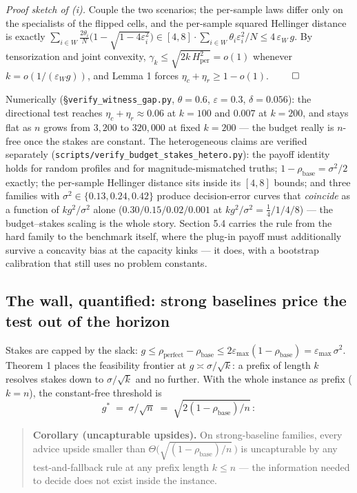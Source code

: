 \emph{Proof sketch of (i).} Couple the two scenarios; the per-sample
laws differ only on the specialists of the flipped cells, and the
per-sample squared Hellinger distance is exactly
\(\sum_{i\in W}\tfrac{2\theta_i}{N}\big(1-\sqrt{1-4\varepsilon_i^2}\big)
\in [4,8]\cdot\sum_{i\in W}\theta_i\varepsilon_i^2/N \le 4\,\varepsilon_W\,g\).
By tensorization and joint convexity,
\(\gamma_k \le \sqrt{2k\,H^2_{\mathrm{per}}} = o(1)\) whenever
\(k = o(1/(\varepsilon_W g))\), and Lemma 1 forces
\(\eta_c+\eta_r\ge 1-o(1)\). \(\qed\)

Numerically (§\texttt{verify\_witness\_gap.py}, \(\theta=0.6\),
\(\varepsilon=0.3\), \(\delta=0.056\)): the directional test reaches
\(\eta_c+\eta_r \approx 0.06\) at \(k=100\) and \(0.007\) at \(k=200\),
and stays flat as \(n\) grows from \(3{,}200\) to \(320{,}000\) at fixed
\(k=200\) --- the budget really is \(n\)-free once the stakes are
constant. The heterogeneous claims are verified separately
(\texttt{scripts/verify\_budget\_stakes\_hetero.py}): the payoff
identity holds for random profiles and for magnitude-mismatched truths;
\(1-\rho_{\mathrm{base}}=
\sigma^2/2\) exactly; the per-sample Hellinger distance sits inside its
\([4,8]\) bounds; and three families with
\(\sigma^2\in\{0.13,0.24,0.42\}\) produce decision-error curves that
\emph{coincide} as a function of \(k g^2/\sigma^2\) alone
(\(0.30/0.15/0.02/0.001\) at \(kg^2/\sigma^2=\tfrac14/1/4/8\)) --- the
budget--stakes scaling is the whole story. Section 5.4 carries the rule
from the hard family to the benchmark itself, where the plug-in payoff
must additionally survive a concavity bias at the capacity kinks --- it
does, with a bootstrap calibration that still uses no problem constants.

\subsection{The wall, quantified: strong baselines price the test out of
the
horizon}

Stakes are capped by the slack:
\(g \le \rho_{\mathrm{perfect}}-\rho_{\mathrm{base}}
\le 2\varepsilon_{\max}(1-\rho_{\mathrm{base}}) = \varepsilon_{\max}\,\sigma^2\).
Theorem 1 places the feasibility frontier at
\(g \asymp \sigma/\sqrt k\): a prefix of length \(k\) resolves stakes
down to \(\sigma/\sqrt k\) and no further. With the whole instance as
prefix (\(k=n\)), the constant-free threshold is
\[g^{*} \;=\; \sigma/\sqrt n \;=\; \sqrt{2(1-\rho_{\mathrm{base}})/n}\,:\]

\begin{quote}
\textbf{Corollary (uncapturable upsides).} On strong-baseline families,
every advice upside smaller than
\(\Theta\big(\sqrt{(1-\rho_{\mathrm{base}})/n}\,\big)\) is uncapturable
by any test-and-fallback rule at any prefix length \(k \le n\) --- the
information needed to decide does not exist inside the instance.
\end{quote}

